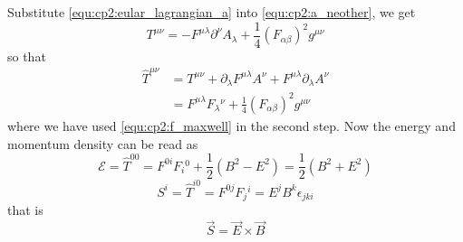\begin{problembody}
\begin{equation}
    \end{equation}
    Substitute \eqref{equ:cp2:eular_lagrangian_a} into \eqref{equ:cp2:a_neother}, we get
    \begin{equation}
        T^{\mu\nu} = -F^{\mu\lambda} \partial^\nu A_\lambda + \frac{1}{4} (F_{\alpha\beta})^2 g^{\mu\nu}
    \end{equation}
    so that
    \begin{align*}
        \widehat{T}^{\mu\nu} 
        & = T^{\mu\nu} + \partial_\lambda F^{\mu\lambda} A^\nu + F^{\mu\lambda} \partial_\lambda A^\nu \\
        & = F^{\mu\lambda} F_\lambda{}^\nu + \frac{1}{4}(F_{\alpha\beta})^2 g^{\mu\nu}
    \end{align*}
    where we have used \eqref{equ:cp2:f_maxwell} in the second step. Now the energy and momentum density 
    can be read as
    \begin{equation*}
        \mathcal{E} = \widehat{T}^{00} = F^{0i}F_i{}^0 + \frac{1}{2}(B^2 - E^2) = \frac{1}{2} (B^2 + E^2)
    \end{equation*}
    \begin{equation*}
        S^i = \widehat{T}^{i0} = F^{0j}F_j{}^i = E^j B^k \epsilon_{jki}
    \end{equation*}
    that is
    \begin{equation*}
        \vec{S} = \vec{E} \times \vec{B}
    \end{equation*}
\end{problembody}

